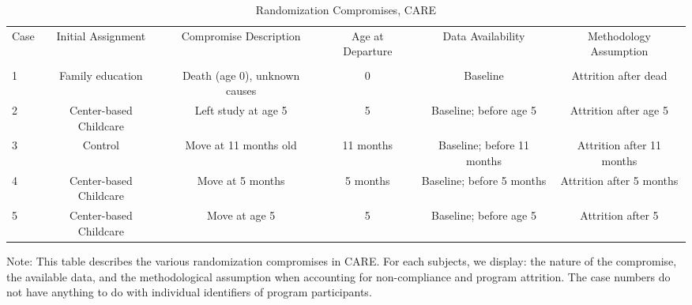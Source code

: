 \begin{sidewaystable}[H] 
\begin{threeparttable}
\caption{Randomization Compromises, CARE}
\label{table:care_compromises}
\centering
\footnotesize
\begin{tabular}{lccccc} \toprule
 Case & Initial Assignment & Compromise Description & Age at Departure & Data Availability & Methodology Assumption \\ \\ \midrule
1&Family education & Death (age 0), unknown causes & 0 & Baseline & Attrition after dead \\
2&Center-based Childcare & Left study at age 5  & 5 &  Baseline; before age 5 & Attrition after age 5 \\
3&Control & Move at 11 months old & 11 months &  Baseline; before 11 months & Attrition after 11 months \\
4&Center-based Childcare & Move at 5 months & 5 months &  Baseline; before 5 months & Attrition after 5 months \\
5&Center-based Childcare & Move at age 5 & 5 &  Baseline; before age 5 & Attrition after 5 \\ \bottomrule
\end{tabular}
\begin{tablenotes}
\item Note: This table describes the various randomization compromises in CARE. For each subjects, we display: the nature of the compromise, the available data, and the methodological assumption when accounting for non-compliance and program attrition. The case numbers do not have anything to do with individual identifiers of program participants. 
\end{tablenotes}
\end{threeparttable}
\end{sidewaystable}